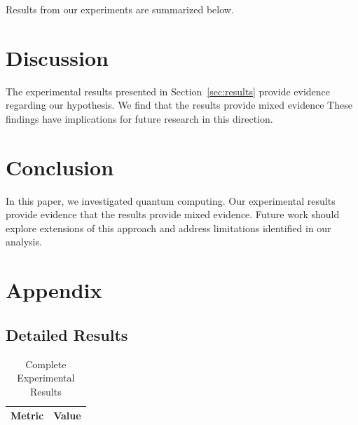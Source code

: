 \documentclass{article}
\begin{document}
\label{sec:results}

Results from our experiments are summarized below.

\section{Discussion}

The experimental results presented in Section~\ref{sec:results} provide evidence regarding our hypothesis. We find that the results provide mixed evidence These findings have implications for future research in this direction.

\section{Conclusion}

In this paper, we investigated quantum computing. Our experimental results provide evidence that the results provide mixed evidence. Future work should explore extensions of this approach and address limitations identified in our analysis.

\appendix

\section{Appendix}

\subsection{Detailed Results}

\begin{table}[htbp]
\centering
\caption{Complete Experimental Results}
\begin{tabular}{lc}
\toprule
Metric & Value \\
\midrule
\bottomrule
\end{tabular}
\end{table}




\end{document}
